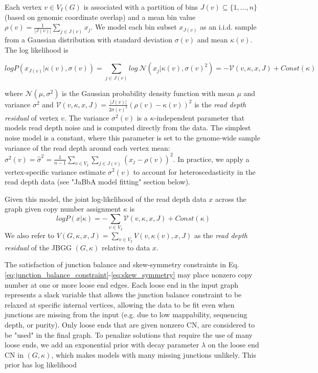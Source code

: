 \documentclass[phd,tocprelim]{cornell}
\begin{document}
Each vertex $v \in V_I(G)$ is associated with a partition of bins $J(v) \subseteq \{1, \ldots, n\}$ (based on genomic coordinate overlap) and a mean bin value $\rho(v) = \frac{1}{|J(v)|}\sum_{j \in J(v)} x_j$.  We model each bin subset $x_{J(v)}$ as an i.i.d. sample from a Gaussian distribution with standard deviation $\sigma(v)$ and mean $\kappa(v)$.  The log likelihood is

\begin{equation} \label{eq:nodeloglikelihood}
    log P(x_{J(v)} | \kappa(v), \sigma(v)) =  \sum_{j \in J(v)} log \ \mathcal{N}(x_j | \kappa(v), \sigma(v)^2) = - \mathcal{V}(v, \kappa, x, J) + Const(\kappa)
\end{equation}

where $\mathcal{N}(\mu, \sigma^2)$ is the Gaussian probability density function with mean $\mu$ and variance $\sigma^2$ and $\mathcal{V}(v, \kappa, x, J) =  \frac{|J(v)|}{2\sigma(v)^2}(\rho(v)- \kappa(v))^2$ is the \textit{read depth residual} of vertex $v$. The variance $\sigma^2(v)$ is a $\kappa$-independent parameter that models read depth noise and is computed directly from the data.  The simplest noise model is a constant, where this parameter is set to the genome-wide sample variance of the read depth around each vertex mean: $\sigma^2(v) = \hat{\sigma}^2 = \frac{1}{n-1} \sum_{v \in V_I} \sum_{j \in J(v)} (x_j - \rho(v))^2$.  In practice, we apply a vertex-specific variance estimate $\sigma^2(v)$ to account for heteroscedasticity in the read depth data (see "JaBbA model fitting" section below).

Given this model, the joint log-likelihood of the read depth data $x$ across the graph given copy number assignment $\kappa$ is
\begin{equation} \label{eq:jointloglikelihood}
    log P(x | \kappa) = - \sum_{v \in V_I} \mathcal{V}(v, \kappa, x, J) + Const(\kappa)
\end{equation}
We also refer to $V(G, \kappa, x, J) = \sum_{v\in V_I} V(v, \kappa(v), x, J)$ as the \textit{read depth residual} of the JBGG $(G, \kappa)$ relative to data $x$.

The satisfaction of junction balance and skew-symmetry constraints in Eq. \ref{eq:junction_balance_constraint}-\ref{eq:skew_symmetry} may place nonzero copy number at one or more loose end edges.   Each loose end in the input graph represents a slack variable that allows the junction balance constraint to be relaxed at specific internal vertices, allowing the data to be fit even when junctions are missing from the input (e.g. due to low mappability, sequencing depth, or purity).  Only loose ends that are given nonzero CN, are considered to be "used" in the final graph. To penalize solutions that require the use of many loose ends, we add an exponential prior with decay parameter $\lambda$ on the loose end CN in $(G, \kappa)$, which makes models with many missing junctions unlikely.  This prior has log likelihood
\end{document}
